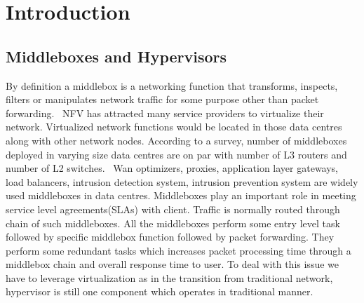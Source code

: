 \documentclass[a4paper,11pt]{report}
\begin{document}
\newpage
\tableofcontents
\listoffigures
\listoftables
\newpage
\chapter{Introduction}
\section{Middleboxes and Hypervisors}
By definition a middlebox is a networking function that transforms, inspects, filters or manipulates network traffic for some purpose other than packet forwarding.~\cite{MB} NFV has attracted many service providers to virtualize their network. Virtualized network functions would be located in those data centres along with other network nodes. According to a survey, number of middleboxes deployed in varying size data centres are on par with number of L3 routers and number of L2 switches.~\cite{DM} Wan optimizers, proxies, application layer gateways, load balancers, intrusion detection system, intrusion prevention system are widely used middleboxes in data centres. Middleboxes play an important role in meeting service level agreements(SLAs) with client. Traffic is normally routed through chain of such middleboxes. All the middleboxes perform some entry level task followed by specific middlebox function followed by packet forwarding. They perform some redundant tasks which increases packet processing time through a middlebox chain and overall response time to user. To deal with this issue we have to leverage virtualization as in the transition from traditional network, hypervisor is still one component which operates in traditional manner.                        
\end{document}
